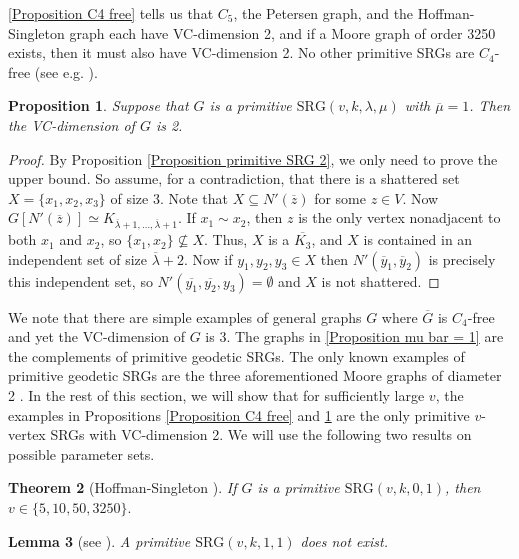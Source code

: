 \documentclass{article}
\newtheorem{thm}{Theorem}
\newtheorem{lemma}[thm]{Lemma}
\newtheorem{prop}[thm]{Proposition}
\theoremstyle{definition}
\begin{document}
\autoref{Proposition C4 free} tells us that $C_5$, the Petersen graph, and the Hoffman-Singleton graph each have VC-dimension 2, and if a Moore graph of order 3250 exists, then it must also have VC-dimension 2. No other primitive SRGs are $C_4$-free (see e.g. \cite{deutsch2001strongly}).

\begin{prop}\label{Proposition mu bar = 1}
    Suppose that $G$ is a primitive $\mathrm{SRG}(v,k,\lambda,\mu)$ with $\overline\mu=1$. Then the VC-dimension of $G$ is 2.
\end{prop}
\begin{proof}
    By Proposition \ref{Proposition primitive SRG 2}, we only need to prove the upper bound. So assume, for a contradiction, that there is a shattered set $X=\{x_1,x_2,x_3\}$ of size 3. Note that $X\subseteq N'(\overline z)$ for some $z\in V$. Now $G[N'(\overline z)]\simeq K_{\overline\lambda+1,\ldots,\overline\lambda+1}$. If $x_1\sim x_2$, then $z$ is the only vertex nonadjacent to both $x_1$ and $x_2$, so $\{x_1,x_2\}\not\subseteq X$. Thus, $X$ is a $\overline{K_3}$, and $X$ is contained in an independent set of size $\overline\lambda+2$. Now if $y_1,y_2,y_3\in X$ then $N'(\overline y_1,\overline y_2)$ is precisely this independent set, so $N'(\overline{y_1},\overline{y_2},y_3)=\emptyset$ and $X$ is not shattered.
\end{proof}

We note that there are simple examples of general graphs $G$ where $\overline G$ is $C_4$-free and yet the VC-dimension of $G$ is 3. The graphs in \autoref{Proposition mu bar = 1} are the complements of primitive geodetic SRGs. The only known examples of primitive geodetic SRGs are the three aforementioned Moore graphs of diameter 2 \cite{blokhuis1988geodetic}. In the rest of this section, we will show that for sufficiently large $v$, the examples in Propositions \ref{Proposition C4 free} and \ref{Proposition mu bar = 1} are the only primitive $v$-vertex SRGs with VC-dimension 2. We will use the following two results on possible parameter sets.

\begin{thm}[Hoffman-Singleton \cite{hoffman1960moore}] \label{Theorem Hoffman-Singleton}
    If $G$ is a primitive $\mathrm{SRG}(v,k,0,1)$, then $v\in\{5,10,50,3250\}.$
\end{thm}

\begin{lemma}[see \cite{deutsch2001strongly}] \label{Lemma vk11}
    A primitive $\mathrm{SRG}(v,k,1,1)$ does not exist.
\end{lemma}
\end{document}

